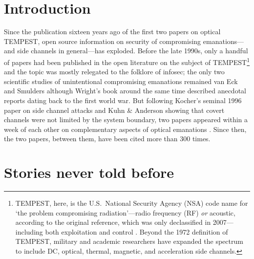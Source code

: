 \documentclass[conference]{IEEEtran}
\begin{document}
\title{}

\author{
}

\maketitle

\begin{abstract}
	
\end{abstract}

\section{Introduction}

Since the publication sixteen years ago of the first two papers on optical
TEMPEST, open source information on security of compromising emanations---and
side channels in general---has exploded. Before the late 1990s, only a
handful of papers had been published in the open literature on the subject of
TEMPEST\footnote{TEMPEST, here, is the U.S.\ National Security Agency (NSA)
code name for `the problem compromising radiation'---radio frequency (RF)
\emph{or} acoustic, according to the original reference, which was only
declassified in 2007---including both exploitation and control
\cite{NSATempest2007}. Beyond the 1972 definition of TEMPEST, military and
academic researchers have expanded the spectrum to include DC, optical,
thermal, magnetic, and acceleration side channels.} and the topic was mostly
relegated to the folklore of infosec; the only two scientific studies of
unintentional compromising emanations remained van Eck \cite{vanEck1985} and
Smulders \cite{Smulders1990} although Wright's book around the same time
\cite{Wright1987} described anecdotal reports dating back to the first world
war. But following Kocher's seminal 1996 paper on side channel attacks
\cite{Kocher1996} and Kuhn \& Anderson \cite{Kuhn1998a} showing that covert
channels were not limited by the system boundary, two papers appeared within
a week of each other on complementary aspects of optical emanations
\cite{Kuhn2002,Loughry2002a}. Since then, the two papers, between them, have
been cited more than 300 times.

\section{Stories never told before}
\end{document}
